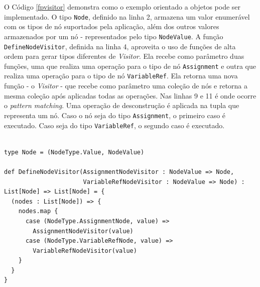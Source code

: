 O Código \ref{fpvisitor} demonstra como o 
exemplo orientado a objetos pode ser implementado. 
O tipo \texttt{Node}, definido na linha 2, armazena um valor 
enumerável com os tipos de nó suportados 
pela aplicação, além dos outros valores 
armazenados por um nó - representados pelo tipo 
\texttt{NodeValue}. A função \texttt{DefineNodeVisitor}, definida 
na linha 4, aproveita o uso de funções de alta ordem 
para gerar tipos diferentes de \textit{Visitor}. Ela 
recebe como parâmetro duas funções, uma que 
realiza uma operação para o tipo de nó \texttt{Assignment} e 
outra que realiza uma operação para o tipo de 
nó \texttt{VariableRef}. Ela retorna uma nova função - o 
\textit{Visitor} - que recebe como parâmetro uma coleção 
de nós e retorna a mesma coleção após aplicadas 
todas as operações. Nas linhas 9 e 11 é onde 
ocorre o \textit{pattern matching}. Uma operação 
de desconstrução é aplicada na tupla que representa 
um nó. Caso o nó seja do tipo \texttt{Assignment}, o 
primeiro caso é executado. Caso seja do tipo 
\texttt{VariableRef}, o segundo caso é executado.

\begin{lstlisting}[caption={\textit{Visitor} Funcional.},label=fpvisitor]
    
type Node = (NodeType.Value, NodeValue)

def DefineNodeVisitor(AssignmentNodeVisitor : NodeValue => Node,
                      VariableRefNodeVisitor : NodeValue => Node) :
List[Node] => List[Node] = {
  (nodes : List[Node]) => {
    nodes.map {
      case (NodeType.AssignmentNode, value) => 
        AssignmentNodeVisitor(value)
      case (NodeType.VariableRefNode, value) => 
        VariableRefNodeVisitor(value)
    }
  }
}
    
\end{lstlisting}
